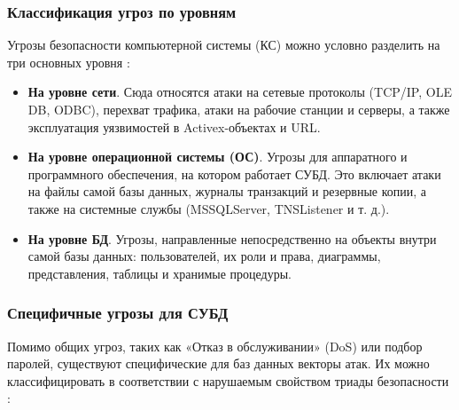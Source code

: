 \subsubsection{Классификация угроз по уровням}
Угрозы безопасности компьютерной системы (КС) можно условно разделить на три основных уровня \autocite{Lihonosov2011}:
\begin{itemize}
	\item \textbf{На уровне сети}. Сюда относятся атаки на сетевые протоколы (TCP/IP, OLE DB, ODBC), перехват трафика, атаки на рабочие станции и серверы, а также эксплуатация уязвимостей в Activex-объектах и URL.
	\item \textbf{На уровне операционной системы (ОС)}. Угрозы для аппаратного и программного обеспечения, на котором работает СУБД. Это включает атаки на файлы самой базы данных, журналы транзакций и резервные копии, а также на системные службы (MSSQLServer, TNSListener и т. д.).
	\item \textbf{На уровне БД}. Угрозы, направленные непосредственно на объекты внутри самой базы данных: пользователей, их роли и права, диаграммы, представления, таблицы и хранимые процедуры.
\end{itemize}

\subsubsection{Специфичные угрозы для СУБД}
Помимо общих угроз, таких как «Отказ в обслуживании» (DoS) или подбор паролей, существуют специфические для баз данных векторы атак. Их можно классифицировать в соответствии с нарушаемым свойством триады безопасности \autocite{Ytebov2008, bdufstec}:

